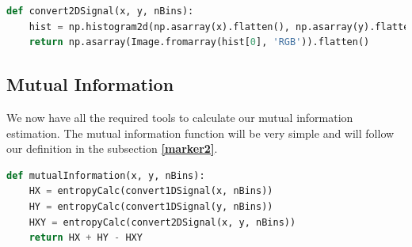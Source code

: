 \documentclass{article}
\begin{document}
\begin{lstlisting}[language=Python, caption=2D Signal (Joint Histogram)]
def convert2DSignal(x, y, nBins):
    hist = np.histogram2d(np.asarray(x).flatten(), np.asarray(y).flatten(), bins=nBins)
    return np.asarray(Image.fromarray(hist[0], 'RGB')).flatten()
\end{lstlisting}

\subsection{Mutual Information}
\begin{flushleft}
We now have all the required tools to calculate our mutual information estimation. The mutual information function will be very simple and will follow our definition in the subsection \textbf{\ref{marker2}}.
\end{flushleft}

\begin{lstlisting}[language=Python, caption=Mutual Information]
def mutualInformation(x, y, nBins):
    HX = entropyCalc(convert1DSignal(x, nBins))
    HY = entropyCalc(convert1DSignal(y, nBins))
    HXY = entropyCalc(convert2DSignal(x, y, nBins))
    return HX + HY - HXY
\end{lstlisting}
\end{document}

